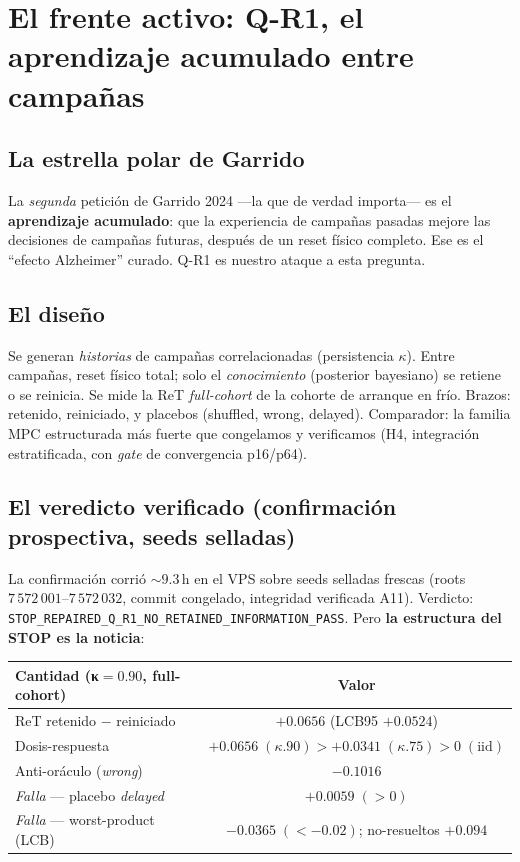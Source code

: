 \documentclass[11pt,a4paper]{article}
\newcommand{\code}[1]{\texttt{#1}}
\begin{document}
\section{El frente activo: Q-R1, el aprendizaje acumulado entre campañas}\label{sec:qr1}

\subsection{La estrella polar de Garrido}
La \emph{segunda} petición de Garrido 2024 —la que de verdad importa— es el \textbf{aprendizaje
acumulado}: que la experiencia de campañas pasadas mejore las decisiones de campañas futuras, después
de un reset físico completo. Ese es el ``efecto Alzheimer'' curado. Q-R1 es nuestro ataque a esta
pregunta.

\subsection{El diseño}
Se generan \emph{historias} de campañas correlacionadas (persistencia $\kappa$). Entre campañas, reset
físico total; solo el \emph{conocimiento} (posterior bayesiano) se retiene o se reinicia. Se mide la
ReT \emph{full-cohort} de la cohorte de arranque en frío. Brazos: retenido, reiniciado, y placebos
(shuffled, wrong, delayed). Comparador: la familia MPC estructurada más fuerte que congelamos y
verificamos (H4, integración estratificada, con \emph{gate} de convergencia p16/p64).

\subsection{El veredicto verificado (confirmación prospectiva, seeds selladas)}
La confirmación corrió ${\sim}9.3$\,h en el VPS sobre seeds selladas frescas (roots
$7\,572\,001$--$7\,572\,032$, commit congelado, integridad verificada A11). Verdicto:
\code{STOP\_REPAIRED\_Q\_R1\_NO\_RETAINED\_INFORMATION\_PASS}. Pero \textbf{la estructura del STOP es la
noticia}:
\begin{center}
\begin{tabular}{lc}
\toprule
Cantidad (κ$=0.90$, full-cohort) & Valor \\
\midrule
ReT retenido $-$ reiniciado & $\mathbf{+0.0656}$ (LCB95 $+0.0524$) \\
Dosis-respuesta & $+0.0656\;(\kappa.90) > +0.0341\;(\kappa.75) > 0\;(\text{iid})$ \\
Anti-oráculo (\emph{wrong}) & $-0.1016$ \\
\midrule
\emph{Falla} — placebo \emph{delayed} & $+0.0059\;(>0)$ \\
\emph{Falla} — worst-product (LCB) & $-0.0365\;(<-0.02)$; no-resueltos $+0.094$ \\
\bottomrule
\end{tabular}
\end{center}
\end{document}
